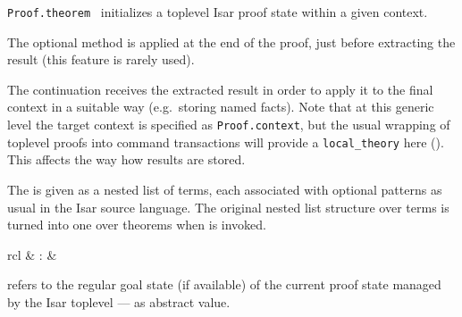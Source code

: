 \begin{isabellebody}
\begin{isamarkuptext}
\begin{description}
  \item \verb|Proof.theorem|~
  initializes a toplevel Isar proof state within a given context.

  The optional  method is applied at the end of
  the proof, just before extracting the result (this feature is rarely
  used).

  The  continuation receives the extracted result
  in order to apply it to the final context in a suitable way (e.g.\
  storing named facts).  Note that at this generic level the target
  context is specified as \verb|Proof.context|, but the usual
  wrapping of toplevel proofs into command transactions will provide a
  \verb|local_theory| here (\chref{ch:local-theory}).  This
  affects the way how results are stored.

  The  is given as a nested list of terms, each
  associated with optional \hyperlink{keyword.is}{\mbox{}} patterns as usual in the
  Isar source language.  The original nested list structure over terms
  is turned into one over theorems when  is
  invoked.

  \end{description}%
\end{isamarkuptext}%
\isamarkuptrue%
%
\endisatagmlref
{\isafoldmlref}%
%
\isadelimmlref
%
\endisadelimmlref
%
\isadelimmlantiq
%
\endisadelimmlantiq
%
\isatagmlantiq
%
\begin{isamarkuptext}%
\begin{matharray}{rcl}
  \hypertarget{ML antiquotation.Isar.goal}{\hyperlink{ML antiquotation.Isar.goal}{\mbox{}}} & : &  \\
  \end{matharray}

  \begin{description}

  \item {} refers to the regular goal state (if
  available) of the current proof state managed by the Isar toplevel
  --- as abstract value.


\end{description}
\end{isamarkuptext}
\end{isabellebody}
